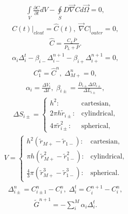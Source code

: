 \documentclass[a4paper,12pt]{extreport}
\begin{document}
   \begin{eqnarray}
   \label{eq:conductivity_integral}
   \int \limits_{V} \frac{\partial C}{\partial t} d V - \oint \limits_{S} D \vec{\nabla}C d\vec{\Omega} = 0,
   \end{eqnarray}
    \vspace{-0.5cm}
\begin{eqnarray}
\label{eq:conductivity_bound_integral}
C\left(t\right) \Big|_{cleat} = \hat{C} \left(t\right), \;
\vec{\nabla} C \Big|_{outer} = 0,
\end{eqnarray}
    \begin{eqnarray}
    \label{eq:langmuir}
    \hat{C} = \frac{C_L\bar{P}}{P_L + \bar{P}}.
    \end{eqnarray}
    \begin{eqnarray}
    \label{eq:conductivity_num}
    \alpha_i \Delta^{t}_i - \beta_{i-}\Delta^{n+1}_{i-} - \beta_{i+}\Delta^{n+1}_{i+}= 0,
    \end{eqnarray}
    \begin{eqnarray}
    \label{eq:conductivity_bound_num}
    C_1^n = \hat{C}^n, \; \Delta_{M+}^n = 0,
    \end{eqnarray}
\begin{eqnarray}
\label{eq:alpha_beta}
\alpha_i = \frac{\Delta V_i}{\Delta t}, \;
\beta_{i\pm} = \frac{\overline{D}_{i\pm} \Delta \Omega_{i\pm}}{\Delta L_{i\pm}},
\end{eqnarray}
\begin{eqnarray}
\Delta S_{i\pm} =\begin{cases}
h^2: & \text{cartesian},\\
2 \pi h \tilde{r}_{i\pm}: & \text{cylindrical},\\
4 \pi \tilde{r}^2_{i\pm}: & \text{spherical},
\end{cases}
\end{eqnarray}
%
\begin{eqnarray}
V=\begin{cases}
h^2 \left(\tilde{r}_{M+} - \tilde{r}_{1-}\right): & \text{cartesian},\\
\pi h \left(\tilde{r}_{M+}^2 - \tilde{r}_{1-}^2\right): & \text{cylindrical},\\
\frac{4}{3} \pi \left(\tilde{r}_{M+}^3-\tilde{r}_{1-}^3\right): & \text{spherical}.
\end{cases}
\end{eqnarray}
\begin{eqnarray}
\label{eq:delta_num}
\Delta_{i\pm}^n = C_{i\pm1}^n - C_{i}^n, \;
\Delta_i^{t} = C_i^{n+1} - C_i^{n},
\end{eqnarray}
%
\begin{eqnarray}
\label{eq:Consumption_conductivity_integral}
\tilde{G}^{n+1} = -\sum_i^M \alpha_i \Delta_i^{t}.
\end{eqnarray}
\newpage
\end{document}
